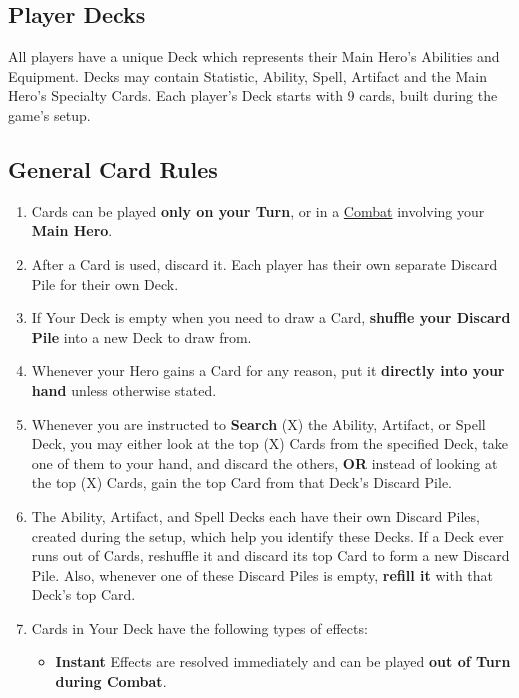 
\begin{multicols*}{2}

\subsection*{\hypertarget{Playerdecks}{Player Decks}}
All players have a unique Deck which represents their Main Hero's Abilities and Equipment.
Decks may contain Statistic, Ability, Spell, Artifact and the Main Hero's Specialty Cards.
Each player's Deck starts with 9 cards, built during the game's setup.

\subsection*{General Card Rules}
\begin{enumerate}
  \item Cards can be played \textbf{only on your Turn}, or in a \hyperlink{Combat}{Combat} involving your \textbf{Main Hero}.
  \item After a Card is used, discard it.
    Each player has their own separate Discard Pile for their own Deck.
  \item If Your Deck is empty when you need to draw a Card, \textbf{shuffle your Discard Pile} into a new Deck to draw from.
  \item Whenever your Hero gains a Card for any reason, put it \textbf{directly into your hand} unless otherwise stated.
  \item Whenever you are instructed to \textbf{Search} (X) the Ability, Artifact, or Spell Deck, you may either look at the top (X) Cards from the specified Deck, take one of them to your hand, and discard the others, \textbf{OR} instead of looking at the top (X) Cards, gain the top Card from that Deck's Discard Pile.
  \item The Ability, Artifact, and Spell Decks each have their own Discard Piles, created during the setup, which help you identify these Decks.
    If a Deck ever runs out of Cards, reshuffle it and discard its top Card to form a new Discard Pile.
    Also, whenever one of these Discard Piles is empty, \textbf{refill it} with that Deck's top Card.
  \item Cards in Your Deck have the following types of effects:
  \begin{itemize}
    \item \textbf{Instant}  Effects are resolved immediately and can be played \textbf{out of Turn during Combat}.

\end{itemize}
\end{enumerate}
\end{multicols*}
